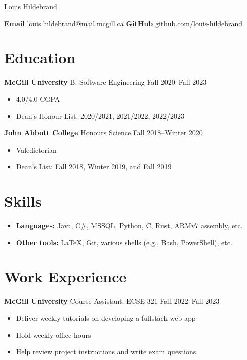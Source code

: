 \documentclass[12pt]{article}
\begin{document}

\pagestyle{empty}

\begin{center}
	\Huge
	Louis Hildebrand
\end{center}
\vspace{0.5\baselineskip}

\textbf{Email}
\href{mailto:louis.hildebrand@mail.mcgill.ca}{louis.hildebrand@mail.mcgill.ca}
\hfill
\textbf{GitHub}
\href{https://github.com/louis-hildebrand}{github.com/louis-hildebrand}

\section*{Education}

\textbf{McGill University} B. Software Engineering
\hfill
Fall 2020--Fall 2023
\begin{itemize}
	\item 4.0/4.0 CGPA
	\item Dean's Honour List: 2020/2021, 2021/2022, 2022/2023
\end{itemize}

\textbf{John Abbott College} Honours Science
\hfill
Fall 2018--Winter 2020
\begin{itemize}
	\item Valedictorian
	\item Dean's List: Fall 2018, Winter 2019, and Fall 2019
\end{itemize}

\section*{Skills}

\begin{itemize}
	\item \textbf{Languages:} Java, C\#, MSSQL, Python, C, Rust, ARMv7 assembly, etc.
	\item \textbf{Other tools:} \LaTeX, Git, various shells (e.g., Bash, PowerShell), etc.
\end{itemize}

\section*{Work Experience}

\textbf{McGill University} Course Assistant: ECSE 321
\hfill
Fall 2022--Fall 2023
\begin{itemize}
	\item Deliver weekly tutorials on developing a fullstack web app
	\item Hold weekly office hours
	\item Help review project instructions and write exam questions
\end{itemize}
\end{document}

